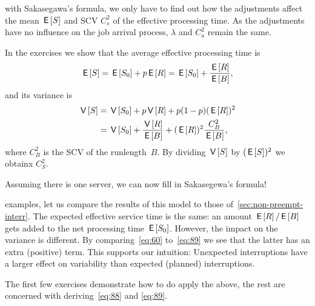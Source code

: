 \documentclass[queueing-book.tex]{subfiles}
\begin{document}
 with Sakasegawa's formula, we only have to find out how the adjustments affect the  mean $\,\mathsf{E}\left[S\right]$ and SCV $C_s^2$ of the effective processing time.
As the adjustments have no influence on the job arrival process, $\lambda$ and $C_a^{2}$ remain the same.

In the exercises we show that the average effective processing time is
\begin{equation} \label{eq:88}
 \,\mathsf{E}\left[S\right] = \,\mathsf{E}\left[S_0\right] + p \,\mathsf{E}\left[R\right] = \,\mathsf{E}\left[S_0\right] + \frac{\,\mathsf{E}\left[R\right]}{\,\mathsf{E}\left[B\right]},
\end{equation}
and its  variance is
\begin{equation}\label{eq:89}
  \begin{split}
 \,\mathsf{V}\left[S\right]
&= \,\mathsf{V}\left[S_0\right] + p\,\mathsf{V}\left[R\right] + p (1-p)(\,\mathsf{E}\left[R\right])^2 \\
&= \,\mathsf{V}\left[S_0\right] + \frac{\,\mathsf{V}\left[R\right]}{\,\mathsf{E}\left[B\right]} + (\,\mathsf{E}\left[R\right])^2\frac{C_B^2}{\,\mathsf{E}\left[B\right]},
 \end{split}
\end{equation}
where $C_B^2$ is the SCV of the runlength~$B$.
By dividing $\,\mathsf{V}\left[S\right]$ by $(\,\mathsf{E}\left[S\right])^{2}$ we obtainx $C_{S}^{2}$.

Assuming there is one server,  we can now  fill in Sakasegewa's formula!


 examples, let us compare the results of this model to those of~\cref{sec:non-preempt-interr}.
The expected effective service time is the same: an amount $\,\mathsf{E}\left[R\right]/ \,\mathsf{E}\left[B\right]$ gets added to the net processing time $\,\mathsf{E}\left[S_0\right]$.
However, the impact on the variance is different.
By comparing~\cref{eq:60} to~\cref{eq:89} we see that the latter has an extra (positive) term.
This supports our intuition: Unexpected interruptions have a larger effect on variability than expected (planned) interruptions.

The first few exercises demonstrate how to do apply the above, the rest are concerned with deriving~\cref{eq:88} and \cref{eq:89}.
\end{document}
